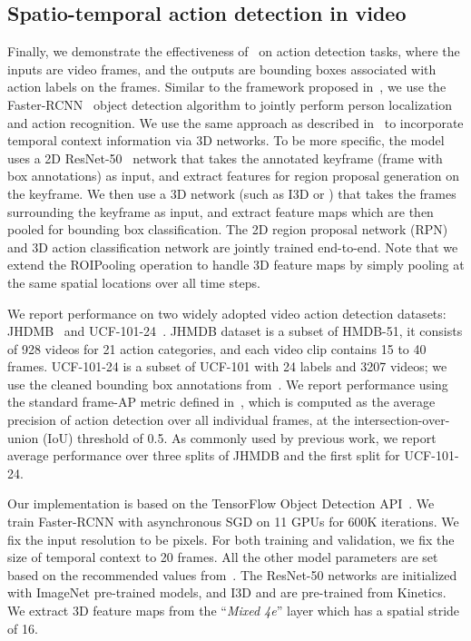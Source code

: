 \documentclass[runningheads]{llncs}
\begin{document}
\subsection{Spatio-temporal action detection in video}
\label{sec:detection}

Finally, we demonstrate the effectiveness of \SG\ on action detection tasks, where the inputs are video frames, and the outputs are bounding boxes associated with action labels on the frames.
Similar to the framework proposed in~\cite{peng2016multi}, we use the Faster-RCNN~\cite{ren2015faster} object detection algorithm to jointly perform person localization and action recognition. We use the same approach as described in~\cite{ava} to incorporate temporal context information via 3D networks. To be more specific, the model uses a 2D ResNet-50~\cite{resnet} network that takes the annotated keyframe (frame with box annotations) as input, and extract features for region proposal generation on the keyframe. We then use a 3D network (such as I3D or \SG) that takes the frames surrounding the keyframe as input, and extract feature maps which are then pooled for bounding box classification. The 2D region proposal network (RPN) and 3D action classification network are jointly trained end-to-end. Note that we extend the ROIPooling operation to handle 3D feature maps by simply pooling at the same spatial locations over all time steps.

We report performance on two widely adopted video action detection datasets: JHDMB~\cite{jhmdb} and UCF-101-24~\cite{ucf101}. JHMDB dataset is a subset of HMDB-51, it consists of 928 videos for 21 action categories, and each video clip contains 15 to 40 frames. UCF-101-24 is a subset of UCF-101 with 24 labels and 3207 videos; we use the cleaned bounding box annotations from~\cite{micro_tube2017}. We report performance using the standard frame-AP metric defined in~\cite{gkioxari2015}, which is computed as the average precision of action detection over all individual frames, at the intersection-over-union (IoU) threshold of 0.5. As commonly used by previous work, we report average performance over three splits of JHMDB and the first split for UCF-101-24.

Our implementation is based on the TensorFlow Object Detection API~\cite{huang2016speed}. We train Faster-RCNN with asynchronous SGD on 11 GPUs for 600K iterations. We fix the input resolution to be  pixels. For both training and validation, we fix the size of temporal context to 20 frames. All the other model parameters are set based on the recommended values from~\cite{huang2016speed}. The ResNet-50 networks are initialized with ImageNet pre-trained models, and I3D and \SG are pre-trained from Kinetics. We extract 3D feature maps from the ``\textit{Mixed 4e}'' layer which has a spatial stride of 16.
\end{document}
